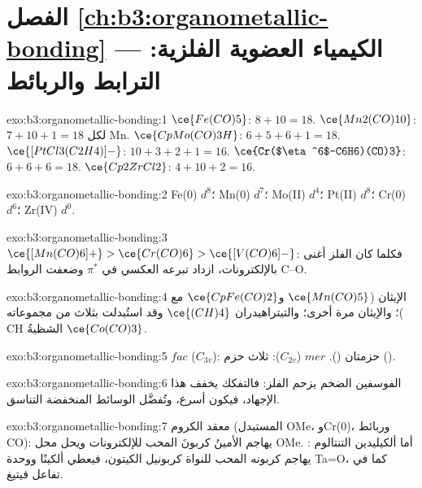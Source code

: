 \section*{الفصل \ref{ch:b3:organometallic-bonding} --- الكيمياء العضوية الفلزية: الترابط والربائط}

\begin{solution}{exo:b3:organometallic-bonding:1}
$\ce{Fe(CO)5}$: $8 + 10 = 18$. $\ce{Mn2(CO)10}$: $7 + 10 + 1 = 18$ لكل Mn. $\ce{CpMo(CO)3H}$: $6 + 5 + 6 + 1 =
18$. $\ce{[PtCl3(C2H4)]-}$: $10 + 3 + 2 + 1 = 16$. $\ce{Cr($\eta^6$-C6H6)(CO)3}$: $6 + 6 + 6 = 18$. $\ce{Cp2ZrCl2}$:
$4 + 10 + 2 = 16$.
\end{solution}

\begin{solution}{exo:b3:organometallic-bonding:2}
Fe(0) $d^8$؛ Mn(0) $d^7$؛ Mo(II) $d^4$؛ Pt(II) $d^8$؛ Cr(0) $d^6$؛ Zr(IV) $d^0$.
\end{solution}

\begin{solution}{exo:b3:organometallic-bonding:3}
$\ce{[Mn(CO)6]+} > \ce{Cr(CO)6} > \ce{[V(CO)6]-}$: فكلما كان الفلز أغنى بالإلكترونات، ازداد
تبرعه العكسي في $\pi^*$ وضعفت الروابط C--O.
\end{solution}

\begin{solution}{exo:b3:organometallic-bonding:4}
الإيثان ($\ce{Mn(CO)5}$ و$\ce{CpFe(CO)2}$  مع )؛ والإيثان مرة أخرى؛ والتيتراهيدران
$\ce{(CH)4}$ وقد استُبدلت بثلاث من مجموعاته CH الشظيةُ $\ce{Co(CO)3}$.
\end{solution}

\begin{solution}{exo:b3:organometallic-bonding:5}
$fac$ ($C_{3v}$): حزمتان (). $mer$ ($C_{2v}$): ثلاث حزم ().
\end{solution}

\begin{solution}{exo:b3:organometallic-bonding:6}
الفوسفين الضخم يزحم الفلز: فالتفكك يخفف هذا الإجهاد، فيكون
أسرع، وتُفضَّل الوسائط المنخفضة التناسق.
\end{solution}

\begin{solution}{exo:b3:organometallic-bonding:7}
معقد الكروم  (المستبدل OMe، وCr(0)، وربائط CO): يهاجم
الأمينُ كربونَ  المحب للإلكترونات ويحل محل OMe. أما ألكيليدين
التنتالوم : يهاجم كربونه المحب للنواة كربونيل
الكيتون، فيعطي ألكينًا ووحدة Ta=O، كما في تفاعل فيتيغ.
\end{solution}

